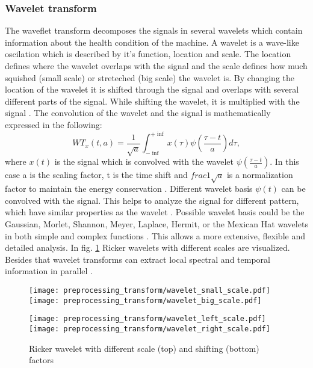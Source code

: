 \subsubsection{Wavelet transform}
The waveflet transform decomposes the signals in several wavelets which contain information about the health condition of the machine. A wavelet is a wave-like oscilation which is described by it's function, location and scale. The location defines where the wavelet overlaps with the signal and the scale defines how much squished (small scale) or streteched (big scale) the wavelet is. By changing the location of the wavelet it is shifted through the signal and overlaps with several different parts of the signal. While shifting the wavelet, it is multiplied with the signal  \cite{Shawhin2020}. The convolution of the wavelet and the signal is mathematically expressed in the following:
\begin{equation}
    WT_{x}(t,a) = \frac{1}{\sqrt{a}} \int_{- \inf}^{+ \inf} x(\tau) \psi(\frac{\tau -t}{a}) d \tau,
\end{equation}
 where $x(t)$ is the signal which is convolved with the wavelet $\psi(\frac{\tau -t}{a})$. In this case a is the scaling factor, t is the time shift and $frac{1}{\sqrt{a}}$ is a normalization factor to maintain the energy conservation \cite{FENG2013}. Different wavelet basis $\psi(t)$ can be convolved with the signal. This helps to analyze the signal for different pattern, which have similar properties as the wavelet \cite{Shawhin2020}. Possible wavelet basis could be the Gaussian, Morlet, Shannon, Meyer, Laplace, Hermit, or the Mexican Hat wavelets in both simple and complex functions \cite{Verstraete2017}. This allows a more extensive, flexible and detailed analysis. In fig. \ref{fig:ricker_wavelet} Ricker wavelets with different scales are visualized. Besides that wavelet transforms can extract local spectral and temporal information in parallel \cite{Shawhin2020}.


\begin{figure}[p]
  \centering
  \texttt{[image: preprocessing\_transform/wavelet\_small\_scale.pdf]}
  \hspace{.1cm}
  \texttt{[image: preprocessing\_transform/wavelet\_big\_scale.pdf]}
  
  \vspace{.1cm}
  
  \texttt{[image: preprocessing\_transform/wavelet\_left\_scale.pdf]}
  \hspace{.1cm}
  \texttt{[image: preprocessing\_transform/wavelet\_right\_scale.pdf]}

  \caption{Ricker wavelet with different scale (top) and shifting (bottom) factors}
  \label{fig:ricker_wavelet}
\end{figure}
\FloatBarrier 

